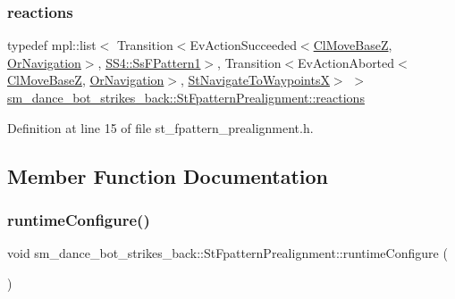 \subsubsection{\texorpdfstring{reactions}{reactions}}
{\footnotesize\ttfamily typedef mpl\+::list$<$ Transition$<$Ev\+Action\+Succeeded$<$\hyperlink{classcl__move__base__z_1_1ClMoveBaseZ}{Cl\+Move\+BaseZ}, \hyperlink{classsm__dance__bot__strikes__back_1_1OrNavigation}{Or\+Navigation}$>$, \hyperlink{structsm__dance__bot__strikes__back_1_1SS4_1_1SsFPattern1}{S\+S4\+::\+Ss\+F\+Pattern1}$>$, Transition$<$Ev\+Action\+Aborted$<$\hyperlink{classcl__move__base__z_1_1ClMoveBaseZ}{Cl\+Move\+BaseZ}, \hyperlink{classsm__dance__bot__strikes__back_1_1OrNavigation}{Or\+Navigation}$>$, \hyperlink{structsm__dance__bot__strikes__back_1_1StNavigateToWaypointsX}{St\+Navigate\+To\+WaypointsX}$>$ $>$ \hyperlink{structsm__dance__bot__strikes__back_1_1StFpatternPrealignment_a2954d92b15e04cee07bd0a5172df7f59}{sm\+\_\+dance\+\_\+bot\+\_\+strikes\+\_\+back\+::\+St\+Fpattern\+Prealignment\+::reactions}}



Definition at line 15 of file st\+\_\+fpattern\+\_\+prealignment.\+h.



\subsection{Member Function Documentation}
\mbox{\label{structsm__dance__bot__strikes__back_1_1StFpatternPrealignment_a12d2806c617371082410914de7444238}} 
\subsubsection{\texorpdfstring{runtime\+Configure()}{runtimeConfigure()}}
{\footnotesize\ttfamily void sm\+\_\+dance\+\_\+bot\+\_\+strikes\+\_\+back\+::\+St\+Fpattern\+Prealignment\+::runtime\+Configure (\begin{DoxyParamCaption}{ }\end{DoxyParamCaption})\hspace{0.3cm}{\ttfamily [inline]}}



